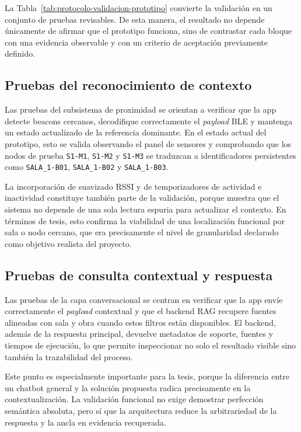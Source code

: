La Tabla~\ref{tab:protocolo-validacion-prototipo} convierte la validación en un conjunto de pruebas revisables. De esta manera, el resultado no depende únicamente de afirmar que el prototipo funciona, sino de contrastar cada bloque con una evidencia observable y con un criterio de aceptación previamente definido.

\subsection{Pruebas del reconocimiento de contexto}

Las pruebas del subsistema de proximidad se orientan a verificar que la app detecte beacons cercanos, decodifique correctamente el \textit{payload} BLE y mantenga un estado actualizado de la referencia dominante. En el estado actual del prototipo, esto se valida observando el panel de sensores y comprobando que los nodos de prueba \texttt{S1-M1}, \texttt{S1-M2} y \texttt{S1-M3} se traduzcan a identificadores persistentes como \texttt{SALA\_1-B01}, \texttt{SALA\_1-B02} y \texttt{SALA\_1-B03}.

La incorporación de suavizado RSSI y de temporizadores de actividad e inactividad constituye también parte de la validación, porque muestra que el sistema no depende de una sola lectura espuria para actualizar el contexto. En términos de tesis, esto confirma la viabilidad de una localización funcional por sala o nodo cercano, que era precisamente el nivel de granularidad declarado como objetivo realista del proyecto.

\subsection{Pruebas de consulta contextual y respuesta}

Las pruebas de la capa conversacional se centran en verificar que la app envíe correctamente el \textit{payload} contextual y que el backend RAG recupere fuentes alineadas con sala y obra cuando estos filtros están disponibles. El backend, además de la respuesta principal, devuelve metadatos de soporte, fuentes y tiempos de ejecución, lo que permite inspeccionar no solo el resultado visible sino también la trazabilidad del proceso.

Este punto es especialmente importante para la tesis, porque la diferencia entre un chatbot general y la solución propuesta radica precisamente en la contextualización. La validación funcional no exige demostrar perfección semántica absoluta, pero sí que la arquitectura reduce la arbitrariedad de la respuesta y la ancla en evidencia recuperada.

